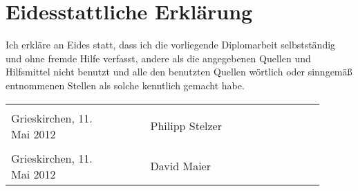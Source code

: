 
{}

\section*{Eidesstattliche Erklärung}

Ich erkläre an Eides statt, dass ich die vorliegende Diplomarbeit selbstständig und ohne fremde Hilfe verfasst, andere als die angegebenen Quellen und Hilfsmittel nicht benutzt und alle den benutzten Quellen wörtlich oder sinngemäß entnommenen Stellen als solche kenntlich gemacht habe.
\begin{flushleft}
	\footnotesize
	\begin{tabular}{@{}p{0.3\linewidth}p{0.1\linewidth}>{\centering\arraybackslash}p{0.5\linewidth}}
		& & \\ \cline{3-3} Grieskirchen, 11. Mai 2012 & & Philipp Stelzer \\ [2\baselineskip]
		& & \\ \cline{3-3} Grieskirchen, 11. Mai 2012 & & David Maier \\
	\end{tabular}
\end{flushleft}

%
%
